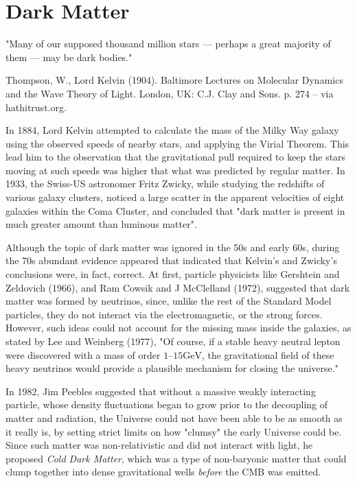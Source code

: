 \documentclass{book}
\begin{document}
	\section{Dark Matter}
	\epigraph{"Many of our supposed thousand million stars — perhaps a great majority of them — may be dark bodies."}{Thompson, W., Lord Kelvin (1904). Baltimore Lectures on Molecular Dynamics and the Wave Theory of Light. London, UK: C.J. Clay and Sons. p. 274 – via hathitrust.org.}
	In 1884, Lord Kelvin attempted to calculate the mass of the Milky Way galaxy using the observed speeds of nearby stars, and applying the Virial Theorem. This lead him to the observation that the gravitational pull required to keep the stars moving at such speeds was higher that what was predicted by regular matter. In 1933, the Swiss-US astronomer Fritz Zwicky, while studying the redshifts of various galaxy clusters, noticed a large scatter in the apparent velocities of eight galaxies within the Coma Cluster, and concluded that "dark matter is present in much greater amount than luminous matter".
	
	Although the topic of dark matter was ignored in the 50s and early 60s, during the 70s abundant evidence appeared that indicated that Kelvin's and Zwicky's conclusions were, in fact, correct. At first, particle physicists like Gershtein and Zeldovich (1966), and Ram Cowsik and J McClelland (1972), suggested that dark matter was formed by neutrinos, since, unlike the rest of the Standard Model particles, they do not interact via the electromagnetic, or the strong forces. However, such ideas could not account for the missing mass inside the galaxies, as stated by Lee and Weinberg (1977), "Of course, if a stable heavy neutral lepton were discovered with a mass of order $1–15 \text{GeV}$, the gravitational field of these heavy neutrinos would provide a plausible mechanism for closing the universe."
	
	In 1982, Jim Peebles suggested that without a massive weakly interacting particle, whose density fluctuations began to grow prior to the decoupling of matter and radiation, the Universe could not have been able to be as smooth as it really is, by setting strict limits on how "clumsy" the early Universe could be. Since such matter was non-relativistic and did not interact with light, he proposed \textit{Cold Dark Matter}, which was a type of non-baryonic matter that could clump together into dense gravitational wells \textit{before} the CMB was emitted.
\end{document}
